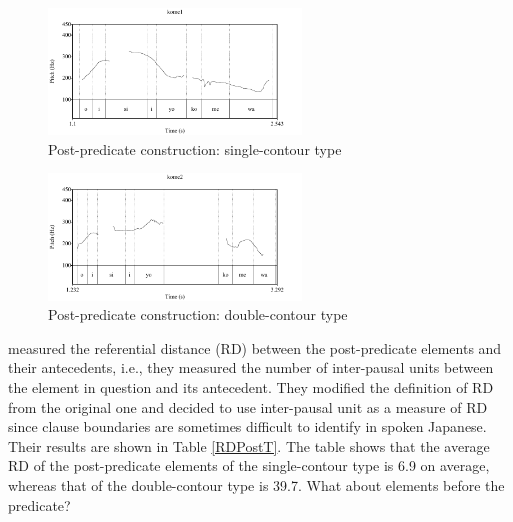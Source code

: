 \begin{figure}
	\begin{center}
	\includegraphics[width=0.6\textwidth]{sounds/kome1.pdf}
	\caption{Post-predicate construction: single-contour type}
	\label{kome1F}
	\end{center}
\end{figure}
\begin{figure}
	\begin{center}
	\includegraphics[width=0.6\textwidth]{sounds/kome2.pdf}
	\caption{Post-predicate construction: double-contour type}
	\label{kome2F}
	\end{center}
\end{figure}

 measured the referential distance (RD) between the post-predicate elements and their antecedents,
i.e., they measured the number of inter-pausal units between the element in question and its antecedent.
They modified the definition of RD from the original one \cite{givon83} and decided to use inter-pausal unit as a measure of RD
since clause boundaries are sometimes difficult to identify in spoken Japanese.
Their results are shown in Table \ref{RDPostT}.
The table shows that the average RD of the post-predicate elements of the single-contour type is 6.9 on average,
whereas that of the double-contour type is 39.7.
What about elements before the predicate?

